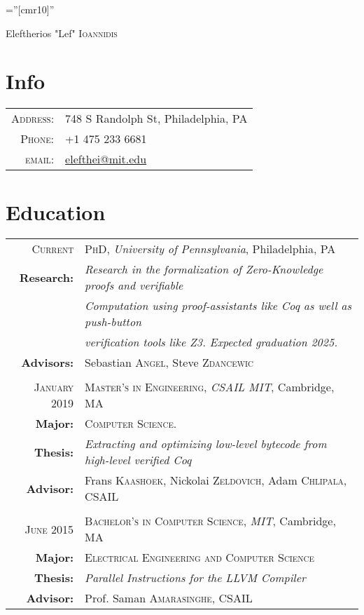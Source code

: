 \documentclass[lettersize,11pt]{article}
\begin{document}
\pagestyle{empty} %
\font\fb=''[cmr10]'' %

\par{\centering
		{\Huge Eleftherios "Lef" \textsc{Ioannidis}
	}
	\bigskip\par}

\section{Info}

\begin{tabular}{rl}
    \textsc{Address:}   & 748 S Randolph St, Philadelphia, PA \\
    \textsc{Phone:}     & +1 475 233 6681\\
    \textsc{email:}     & \href{mailto:elefthei@mit.edu}{elefthei@mit.edu}
\end{tabular}

\section{Education}
\begin{tabular}{rl}
\textsc{Current} & \textsc{PhD}, \emph{University of Pennsylvania}, Philadelphia, PA\\
\textbf{Research:} & \emph{Research in the formalization of Zero-Knowledge proofs and verifiable}\\
& \emph{Computation using proof-assistants like Coq as well as push-button} \\
& \emph{verification tools like Z3. Expected graduation 2025.} \\
\textbf{Advisors:} & Sebastian \textsc{Angel}, Steve \textsc{Zdancewic}\\
& \\
\textsc{January} 2019 & \textsc{Master's in Engineering}, \emph{CSAIL MIT}, Cambridge, MA\\
\textbf{Major:} & \textsc{Computer Science.}\\
\textbf{Thesis:} & \emph{Extracting and optimizing low-level bytecode from high-level verified Coq}\\
\textbf{Advisor:} & Frans \textsc{Kaashoek}, Nickolai \textsc{Zeldovich}, Adam \textsc{Chlipala},  CSAIL\\
 & \\
\textsc{June} 2015 & \textsc{Bachelor's in Computer Science}, \emph{MIT}, Cambridge, MA\\
\textbf{Major:} & \textsc{Electrical Engineering and Computer Science}\\
\textbf{Thesis:} & \emph{Parallel Instructions for the LLVM Compiler}\\
\textbf{Advisor:} & Prof. Saman \textsc{Amarasinghe}, CSAIL\\
\end{tabular}
\end{document}
